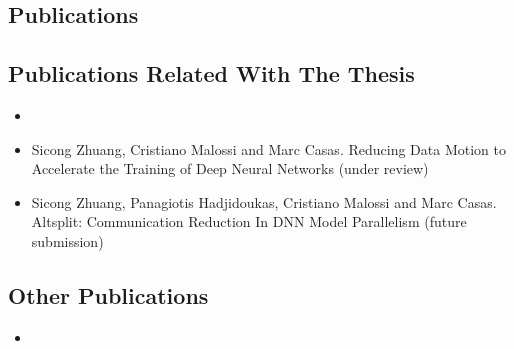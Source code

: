 \begin{appendices}
\chapter{Publications}
\section{Publications Related With The Thesis}
\begin{itemize}
	\item {}
	\item Sicong Zhuang, Cristiano Malossi and Marc Casas. Reducing Data Motion 
        to Accelerate the Training of Deep Neural Networks (under review)
	\item Sicong Zhuang, Panagiotis Hadjidoukas, Cristiano Malossi and Marc 
        Casas. Altsplit: Communication Reduction In DNN Model Parallelism 
        (future submission)
\end{itemize}

\section{Other Publications}
\begin{itemize}
    \item {}
\end{itemize}

\end{appendices}
